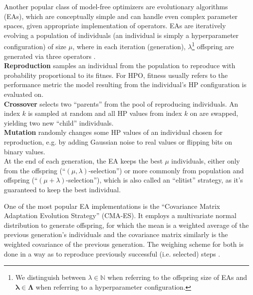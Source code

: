 \documentclass[twoside,11pt]{article}
\begin{document}
Another popular class of model-free optimizers are evolutionary algorithms (EAs), which are conceptually simple and can handle even complex parameter spaces,
given appropriate implementation of operators.
EAs are iteratively evolving a population of individuals (an individual is simply a hyperparameter configuration) of size $\mu$, where in each iteration (generation),
$\lambda$\footnote{We distinguish between $\lambda\in\mathbb{N}$ when referring to the offspring size of EAs and $\boldsymbol\lambda\in\boldsymbol\Lambda$ when
referring to a hyperparameter configuration.} offspring are generated via three operators \citep[pp. 10-14]{genetic_algos}.
\\
\textbf{Reproduction} samples an individual from the population to reproduce with probability proportional to its fitnes. For HPO, fitness usually refers to the
performance metric the model resulting from the individual's HP configuration is evaluated on.
\\
\textbf{Crossover} selects two ``parents'' from the pool of reproducing individuals. An index $k$ is sampled at random and all HP values from
index $k$ on are swapped, yielding two new ``child'' individuals.
\\
\textbf{Mutation} randomly changes some HP values of an individual chosen for reproduction, e.g. by adding Gaussian noise to real values or flipping bits
on binary values.
\\
At the end of each generation, the EA keeps the best $\mu$ individuals, either only from the offspring (``$(\mu,\lambda)$-selection'') or more commonly from
population and offspring (``$(\mu+\lambda)$-selection''), which is also called an ``elitist'' strategy, as it's guaranteed to keep the best individual.
\citep[p. 188]{simon2013evolutionary}

One of the most popular EA implementations is the ``Covariance Matrix Adaptation Evolution Strategy'' (CMA-ES).
It employs a multivariate normal distribution to generate offspring, for which the mean is a weighted average of the previous generation's individuals
and the covariance matrix similarly is the weighted covariance of the previous generation.
The weighing scheme for both is done in a way as to reproduce previously successful (i.e. selected) steps \citep[pp. 8-11]{hansen2023cmaevolutionstrategytutorial}.
\end{document}
